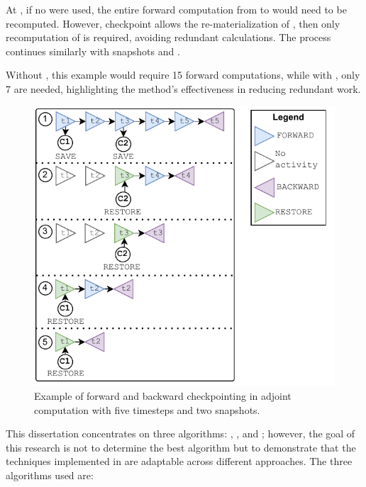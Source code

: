 \documentclass[Ingles]{ic-tese-v3}
\begin{document}
At , if no \checkpointing were used, the entire forward computation from  to  would need to be recomputed. However, checkpoint  allows the re-materialization of , then only recomputation of  is required, avoiding redundant calculations. The process continues similarly with snapshots  and .

Without \checkpointing, this example would require 15 forward computations, while with \checkpointing, only 7 are needed, highlighting the method's effectiveness in reducing redundant work.

\begin{figure}
    \centering
    \includegraphics[width=0.6\linewidth,clip]{figures/checkpointing.pdf}
    \caption[Checkpointing timeline]{Example of forward and backward checkpointing in adjoint computation with five timesteps and two snapshots.}
    \label{fig:checkpointing}
\end{figure}
 
This dissertation concentrates on three \checkpointing algorithms: \revolve \cite{revolve}, \uniform, and \zcut \cite{zcut}; however, the goal of this research is not to determine the best algorithm but to demonstrate that the techniques implemented in \gpuzip are adaptable across different \checkpointing approaches. The three \checkpointing algorithms used are:
\end{document}
